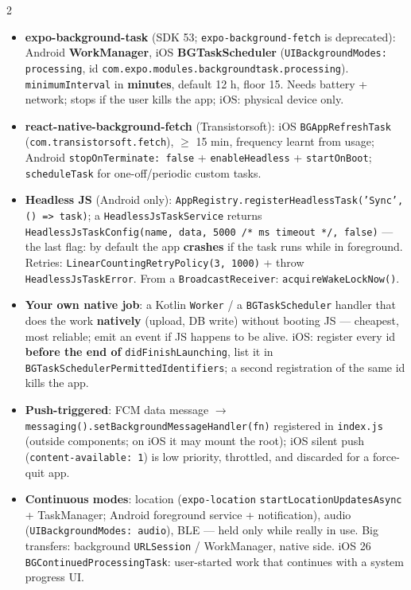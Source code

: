 \documentclass[8pt]{extarticle}
\newcommand\ct[1]{\texttt{#1}}
\newcommand\fat{\hbox{=}\hbox{>}}         %
\newcommand\hd[1]{\par\vspace{3pt}\noindent{\bfseries\color{sheetBlue}#1}\par\vspace{1pt}}
\begin{document}
\begin{multicols}{2}
\raggedright{}

\hd{The options}
\begin{itemize}
  \item \textbf{expo-background-task} (SDK 53; \ct{expo-background-fetch} is deprecated): Android
        \textbf{WorkManager}, iOS \textbf{BGTaskScheduler} (\ct{UIBackgroundModes: processing},
        id \ct{com.expo.modules.backgroundtask.processing}). \ct{minimumInterval} in
        \textbf{minutes}, default 12 h, floor 15. Needs battery + network; stops if the user kills
        the app; iOS: physical device only.
  \item \textbf{react-native-background-fetch} (Transistorsoft): iOS \ct{BGAppRefreshTask}
        (\ct{com.transistorsoft.fetch}), $\geq$ 15 min, frequency learnt from usage; Android
        \ct{stopOnTerminate: false} + \ct{enableHeadless} + \ct{startOnBoot}; \ct{scheduleTask}
        for one-off/periodic custom tasks.
  \item \textbf{Headless JS} (Android only): \ct{AppRegistry.registerHeadlessTask('Sync',
        () \fat{} task)}; a \ct{HeadlessJsTaskService} returns \ct{HeadlessJsTaskConfig(name, data,
        5000 /* ms timeout */, false)} — the last flag: by default the app \textbf{crashes} if the
        task runs while in foreground. Retries: \ct{LinearCountingRetryPolicy(3, 1000)} + throw
        \ct{HeadlessJsTaskError}. From a \ct{BroadcastReceiver}: \ct{acquireWakeLockNow()}.
  \item \textbf{Your own native job}: a Kotlin \ct{Worker} / a \ct{BGTaskScheduler} handler that
        does the work \textbf{natively} (upload, DB write) without booting JS — cheapest, most
        reliable; emit an event if JS happens to be alive. iOS: register every id \textbf{before
        the end of} \ct{didFinishLaunching}, list it in \ct{BGTaskSchedulerPermittedIdentifiers};
        a second registration of the same id kills the app.
  \item \textbf{Push-triggered}: FCM data message $\to$
        \ct{messaging().setBackgroundMessageHandler(fn)} registered in \ct{index.js} (outside
        components; on iOS it may mount the root); iOS silent push (\ct{content-available: 1}) is
        low priority, throttled, and discarded for a force-quit app.
  \item \textbf{Continuous modes}: location (\ct{expo-location}
        \ct{startLocationUpdatesAsync} + TaskManager; Android foreground service +
        notification), audio (\ct{UIBackgroundModes: audio}), BLE — held only while really in use.
        Big transfers: background \ct{URLSession} / WorkManager, native side. iOS 26
        \ct{BGContinuedProcessingTask}: user-started work that continues with a system progress UI.
\end{itemize}


\end{multicols}
\end{document}
